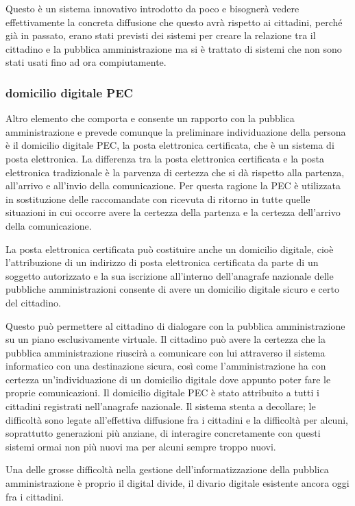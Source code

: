 Questo è un sistema innovativo introdotto da poco e bisognerà vedere effettivamente la concreta diffusione che questo avrà rispetto ai cittadini, perché già in passato, erano stati previsti dei sistemi per creare la relazione tra il cittadino e la pubblica amministrazione ma si è trattato di sistemi che non sono stati usati fino ad ora compiutamente.

\subsubsection{domicilio digitale PEC}
 Altro elemento che comporta e consente un rapporto con la pubblica amministrazione e prevede comunque la preliminare individuazione della persona è il domicilio digitale PEC, la posta elettronica certificata, che è un sistema di posta elettronica. 
 La differenza tra la posta elettronica certificata e la posta elettronica tradizionale è la parvenza di certezza che si dà rispetto alla partenza, all'arrivo e all'invio della comunicazione. Per questa ragione la PEC è utilizzata in sostituzione delle raccomandate con ricevuta di ritorno in tutte quelle situazioni in cui occorre avere la certezza della partenza e la certezza dell'arrivo della comunicazione.\par
 La posta elettronica certificata può costituire anche un domicilio digitale, cioè l'attribuzione di un indirizzo di posta elettronica certificata da parte di un soggetto autorizzato e la sua iscrizione all'interno dell'anagrafe nazionale delle pubbliche amministrazioni consente di avere un domicilio digitale sicuro e certo del cittadino.\par
 Questo può permettere al cittadino di dialogare con la pubblica amministrazione su un piano esclusivamente virtuale. Il cittadino può avere la certezza che la pubblica amministrazione riuscirà a comunicare con lui attraverso il sistema informatico con una destinazione sicura, così come l'amministrazione ha con certezza un'individuazione di un domicilio digitale dove appunto poter fare le proprie comunicazioni.
 Il domicilio digitale PEC è stato attribuito a tutti i cittadini registrati nell'anagrafe nazionale. Il sistema stenta a decollare; 
 le difficoltà sono legate all'effettiva diffusione fra i cittadini e la difficoltà per alcuni, soprattutto generazioni più anziane, di interagire concretamente con questi sistemi ormai non più nuovi ma per alcuni sempre troppo nuovi. \par
 Una delle grosse difficoltà nella gestione dell'informatizzazione della pubblica amministrazione è proprio il digital divide, il divario digitale esistente  ancora oggi fra i cittadini.
 
